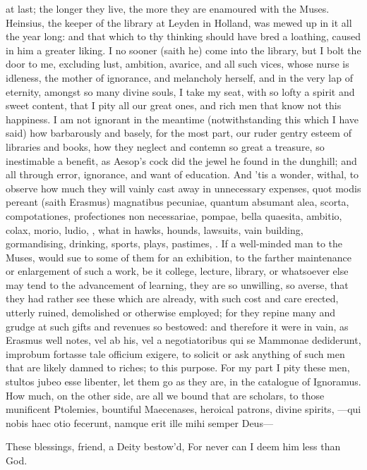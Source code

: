 {at last; the longer they live, the more they are enamoured with the
Muses. Heinsius, the keeper of the library at Leyden in Holland, was
mewed up in it all the year long: and that which to thy thinking should
have bred a loathing, caused in him a greater liking. I no sooner
(saith he) come into the library, but I bolt the door to me, excluding
lust, ambition, avarice, and all such vices, whose nurse is idleness,
the mother of ignorance, and melancholy herself, and in the very lap of
eternity, amongst so many divine souls, I take my seat, with so lofty a
spirit and sweet content, that I pity all our great ones, and rich men
that know not this happiness. I am not ignorant in the meantime
(notwithstanding this which I have said) how barbarously and basely,
for the most part, our ruder gentry esteem of libraries and books, how
they neglect and contemn so great a treasure, so inestimable a benefit,
as Aesop's cock did the jewel he found in the dunghill; and all through
error, ignorance, and want of education. And 'tis a wonder, withal, to
observe how much they will vainly cast away in unnecessary expenses,
quot modis pereant (saith Erasmus) magnatibus pecuniae, quantum
absumant alea, scorta, compotationes, profectiones non necessariae,
pompae, bella quaesita, ambitio, colax, morio, ludio, \etc{}, what in
hawks, hounds, lawsuits, vain building, gormandising, drinking, sports,
plays, pastimes, \etc{}. If a well-minded man to the Muses, would sue to
some of them for an exhibition, to the farther maintenance or
enlargement of such a work, be it college, lecture, library, or
whatsoever else may tend to the advancement of learning, they are so
unwilling, so averse, that they had rather see these which are already,
with such cost and care erected, utterly ruined, demolished or
otherwise employed; for they repine many and grudge at such gifts and
revenues so bestowed: and therefore it were in vain, as Erasmus well
notes, vel ab his, vel a negotiatoribus qui se Mammonae dediderunt,
improbum fortasse tale officium exigere, to solicit or ask anything of
such men that are likely damned to riches; to this purpose. For my part
I pity these men, stultos jubeo esse libenter, let them go as they are,
in the catalogue of Ignoramus. How much, on the other side, are all we
bound that are scholars, to those munificent Ptolemies, bountiful
Maecenases, heroical patrons, divine spirits,
---qui nobis haec otio fecerunt, namque erit ille mihi semper
Deus---

These blessings, friend, a Deity bestow'd,
For never can I deem him less than God.

}
